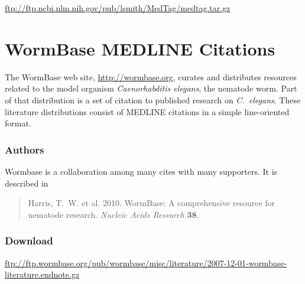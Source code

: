 \url{ftp://ftp.ncbi.nlm.nih.gov/pub/lsmith/MedTag/medtag.tar.gz}




\section{WormBase MEDLINE Citations}

The WormBase web site, \url{http://wormbase.org}, curates and distributes
resources related to the model organism {\it Caenorhabditis elegans},
the nematode worm.  Part of that distribution is a set of citation to
published research on {\it C.~elegans}.  These literature
distributions consist of MEDLINE citations in a simple line-oriented
format.

\subsubsection{Authors}

Wormbase is a collaboration among many cites with many supporters.
It is described in 
%
\begin{quote}
Harris, T.~W. et al. 2010. WormBase: A comprehensive resource for
nematode research. {\it Nucleic Acids Research} {\bf 38}.
\end{quote}

\subsubsection{Download}

\url{ftp://ftp.wormbase.org/pub/wormbase/misc/literature/2007-12-01-wormbase-literature.endnote.gz}


